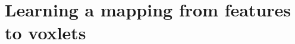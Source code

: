 \documentclass[10pt,twocolumn,letterpaper]{article}
\newcommand{\point}{\mathbf{p}}
\begin{document}







\section{Learning a mapping from features to voxlets}
\label{sec:forest_train}
\end{document}
